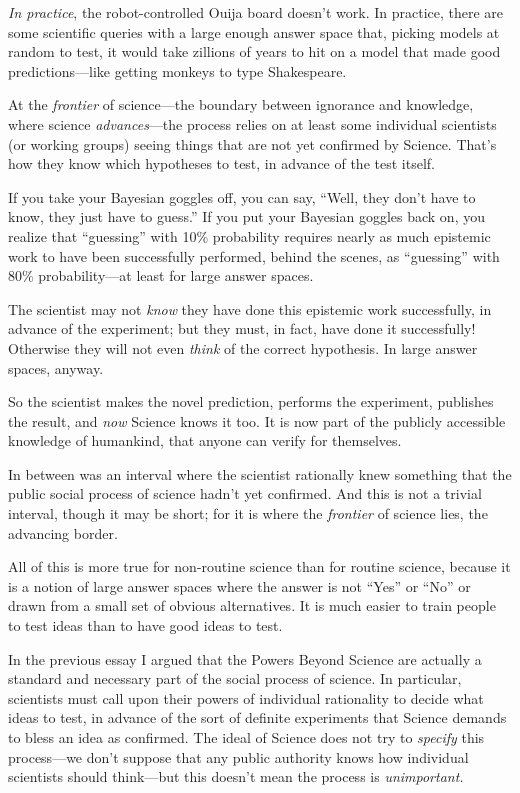 {
 \textit{In practice}, the robot-controlled Ouija board
doesn't work. In practice, there are some scientific
queries with a large enough answer space that, picking models at random
to test, it would take zillions of years to hit on a model that made
good predictions---like getting monkeys to type Shakespeare.}

{
 At the \textit{frontier} of science---the boundary between
ignorance and knowledge, where science \textit{advances}{}---the
process relies on at least some individual scientists (or working
groups) seeing things that are not yet confirmed by Science.
That's how they know which hypotheses to test, in
advance of the test itself.}

{
 If you take your Bayesian goggles off, you can say,
``Well, they don't have to know, they
just have to guess.'' If you put your Bayesian
goggles back on, you realize that
``guessing'' with 10\% probability
requires nearly as much epistemic work to have been successfully
performed, behind the scenes, as
``guessing'' with 80\%
probability---at least for large answer spaces.}

{
 The scientist may not \textit{know} they have done this epistemic
work successfully, in advance of the experiment; but they must, in
fact, have done it successfully! Otherwise they will not even
\textit{think} of the correct hypothesis. In large answer spaces,
anyway.}

{
 So the scientist makes the novel prediction, performs the
experiment, publishes the result, and \textit{now} Science knows it
too. It is now part of the publicly accessible knowledge of humankind,
that anyone can verify for themselves.}

{
 In between was an interval where the scientist rationally knew
something that the public social process of science
hadn't yet confirmed. And this is not a trivial
interval, though it may be short; for it is where the \textit{frontier}
of science lies, the advancing border.}

{
 All of this is more true for non-routine science than for routine
science, because it is a notion of large answer spaces where the answer
is not ``Yes'' or
``No'' or drawn from a small set of
obvious alternatives. It is much easier to train people to test ideas
than to have good ideas to test.}

\myendsectiontext


\bigskip


{
 In the previous essay I argued that the Powers Beyond Science are
actually a standard and necessary part of the social process of
science. In particular, scientists must call upon their powers of
individual rationality to decide what ideas to test, in advance of the
sort of definite experiments that Science demands to bless an idea as
confirmed. The ideal of Science does not try to \textit{specify} this
process---we don't suppose that any public authority
knows how individual scientists should think---but this
doesn't mean the process is \textit{unimportant.} }

